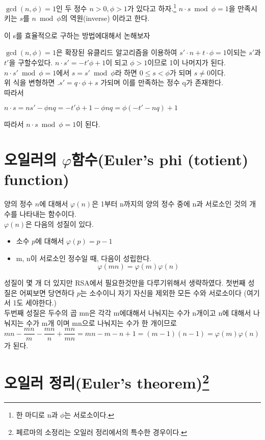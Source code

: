 $\gcd(n,\phi)=1$인 두 정수 $n>0, \phi>1$가 있다고 하자.\footnote{한 마디로 n과 $\phi$는 서로소이다.}
$n\cdot s\bmod  \phi =1 $을 만족시키는 $s$를 $n\bmod  \phi$의 역원(inverse) 이라고 한다.\par
이 s를 효율적으로 구하는 방법에대해서 논해보자\par
$\gcd(n,\phi)=1$은 확장된 유클리드 알고리즘을 이용하여 $s'\cdot n + t \cdot \phi = 1$이되는 $s'$과 $t'$을 구할수있다. 
$n\cdot s'= -t'\phi+1$이 되고 $\phi>1$이므로 1이 나머지가 된다.
$n\cdot s'\bmod  \phi =1$에서 $s= s'\bmod  \phi$라 하면 $0 \le s <\phi$가 되며 $s  \ne 0$이다.\\
위 식을 변형하면 .$s'=q\cdot \phi +s$ 가되며 이를 만족하는 정수 q가 존재한다. \\
따라서 
\begin{center}
    $n\cdot s=ns'-\phi nq=-t'\phi +1 -\phi nq=\phi(-t'-nq)+1 $
\end{center}
따라서 $n\cdot s\bmod  \phi =1 $이 된다.




\section{오일러의 $\varphi$함수(Euler’s phi (totient) function)}
양의 정수 $n$에 대해서 $\varphi (n)$은 1부터 n까지의 양의 정수 중에 n과 서로소인 것의 개수를 나타내는 함수이다.\\
$\varphi (n)$은 다음의 성질이 있다.
\begin{itemize}
\item{소수 $p$에 대해서  $\varphi (p)=p-1$}
\item{ m, n이 서로소인 정수일 때, 다음이 성립한다. \[\varphi (mn)=\varphi (m)\varphi (n)\]}
\end{itemize}
성질이 몇 개 더 있지만 RSA에서 필요한것만을 다루기위해서 생략하였다.
첫번째 성질은 어찌보면 당연하다 $p$는 소수이니 자기 자신을 제외한 모든 수와 서로소이다 (여기서 1도 세야한다.)\\
두번째 성질은 두수의 곱 mn은 각각 m에대해서 나눠지는 수가 n개이고 n에 대해서 나눠지는 수가 m개 이며 mn으로 나눠지는 수가 한 개이므로 
$mn -\dfrac{mn}{m}-\dfrac{mn}{n}+\dfrac{mn}{mn} =mn -m -n +1=(m-1)(n-1)=\varphi (m)\varphi(n)$가 된다.

\section{오일러 정리(Euler's theorem)\protect\footnote{페르마의 소정리는 오일러 정리에서의 특수한 경우이다.}}


